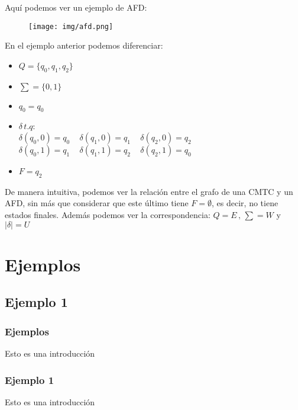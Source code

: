 \documentclass{beamer}
\begin{document}
\begin{frame}
Aquí podemos ver un ejemplo de AFD:
\newline
\begin{figure}[h]
  \centering
    \texttt{[image: img/afd.png]}
  \label{fig:ejemplo}
\end{figure}
\end{frame}
\begin{frame}
En el ejemplo anterior podemos diferenciar:
\begin{itemize}
\item $Q=\{q_0,q_1,q_2 \}$
\item $\sum = \{0,1\}$
\item $q_0=q_0$
\item $\delta \, t.q$:
\\
$\delta(q_0,0)=q_0 \,\,\,\,\,\,\, \delta(q_1,0)=q_1\,\,\,\,\,\,\, \delta(q_2,0)=q_2$
\\
$\delta(q_0,1)=q_1 \,\,\,\,\,\,\,  \delta(q_1,1)=q_2 \,\,\,\,\,\,\,\delta(q_2,1)=q_0$
\item $F={q_2}$
\end{itemize}
\end{frame}
\begin{frame}
De manera intuitiva, podemos ver la relación entre el grafo de una CMTC y un AFD, sin más que considerar que este último tiene $F={\emptyset}$, es decir, no tiene estados finales.
\newline\newline
Además podemos ver la correspondencia: $Q=E\, ,\, \sum=W$ y $| \delta |=U$
\end{frame}
\section{Ejemplos}
\subsection{Ejemplo 1}
\begin{frame}
    \frametitle{Ejemplos}
    Esto es una introducción
\end{frame}
\begin{frame}
    \frametitle{Ejemplo 1}
    Esto es una introducción
\end{frame}
\end{document}
